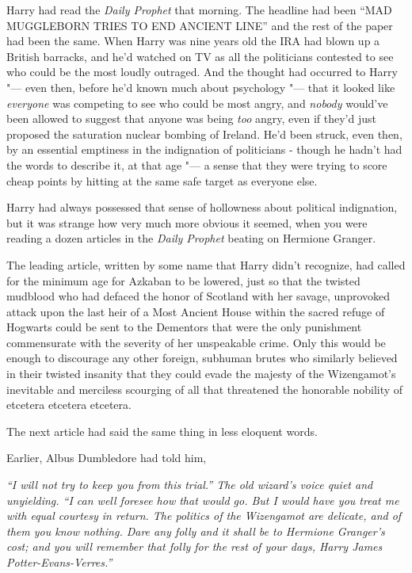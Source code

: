 Harry had read the \emph{Daily Prophet} that morning. The headline had
been ``MAD MUGGLEBORN TRIES TO END ANCIENT LINE'' and the rest of the
paper had been the same. When Harry was nine years old the IRA had blown
up a British barracks, and he'd watched on TV as all the politicians
contested to see who could be the most loudly outraged. And the thought
had occurred to Harry "--- even then, before he'd known much about
psychology "--- that it looked like \emph{everyone} was competing to see
who could be most angry, and \emph{nobody} would've been allowed to
suggest that anyone was being \emph{too} angry, even if they'd just
proposed the saturation nuclear bombing of Ireland. He'd been struck,
even then, by an essential emptiness in the indignation of politicians -
though he hadn't had the words to describe it, at that age "--- a sense
that they were trying to score cheap points by hitting at the same safe
target as everyone else.

Harry had always possessed that sense of hollowness about political
indignation, but it was strange how very much more obvious it seemed,
when you were reading a dozen articles in the \emph{Daily Prophet}
beating on Hermione Granger.

The leading article, written by some name that Harry didn't recognize,
had called for the minimum age for Azkaban to be lowered, just so that
the twisted mudblood who had defaced the honor of Scotland with her
savage, unprovoked attack upon the last heir of a Most Ancient House
within the sacred refuge of Hogwarts could be sent to the Dementors that
were the only punishment commensurate with the severity of her
unspeakable crime. Only this would be enough to discourage any other
foreign, subhuman brutes who similarly believed in their twisted
insanity that they could evade the majesty of the Wizengamot's
inevitable and merciless scourging of all that threatened the honorable
nobility of etcetera etcetera etcetera.

The next article had said the same thing in less eloquent words.

Earlier, Albus Dumbledore had told him,

\emph{``I will not try to keep you from this trial.'' The old wizard's
voice quiet and unyielding. ``I can well foresee how that would go. But
I would have you treat me with equal courtesy in return. The politics of
the Wizengamot are delicate, and of them you know nothing. Dare any
folly and it shall be to Hermione Granger's cost; and you will remember
that folly for the rest of your days, Harry James
Potter-Evans-Verres.''}

